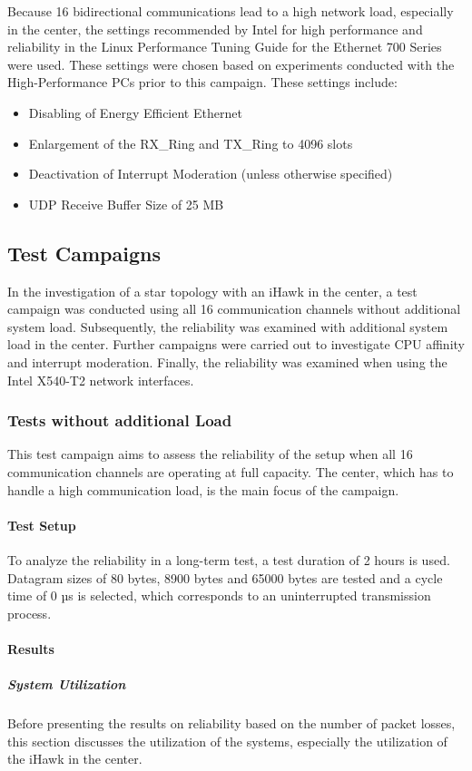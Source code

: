 Because 16 bidirectional communications lead to a high network load, especially in the center, the settings recommended by Intel for high performance and reliability in the Linux Performance Tuning Guide for the Ethernet 700 Series \cite{intermod03} were used. These settings were chosen based on experiments conducted with the High-Performance PCs prior to this campaign. These settings include:
\begin{itemize}
  \item Disabling of Energy Efficient Ethernet
  \item Enlargement of the RX\_Ring and TX\_Ring to 4096 slots
  \item Deactivation of Interrupt Moderation (unless otherwise specified)
  \item UDP Receive Buffer Size of 25 MB
\end{itemize}

\subsection{Test Campaigns}
In the investigation of a star topology with an iHawk in the center, a test campaign was conducted using all 16 communication channels without additional system load. Subsequently, the reliability was examined with additional system load in the center. Further campaigns were carried out to investigate CPU affinity and interrupt moderation. Finally, the reliability was examined when using the Intel X540-T2 network interfaces.

\subsubsection{Tests without additional Load} \label{chap:noaddloadTest}
This test campaign aims to assess the reliability of the setup when all 16 communication channels are operating at full capacity. The center, which has to handle a high communication load, is the main focus of the campaign.

\paragraph{Test Setup}
To analyze the reliability in a long-term test, a test duration of 2 hours is used. Datagram sizes of 80 bytes, 8900 bytes and 65000 bytes are tested and a cycle time of 0 µs is selected, which corresponds to an uninterrupted transmission process.

\paragraph{Results}
\subparagraph{System Utilization}
Before presenting the results on reliability based on the number of packet losses, this section discusses the utilization of the systems, especially the utilization of the iHawk in the center.

